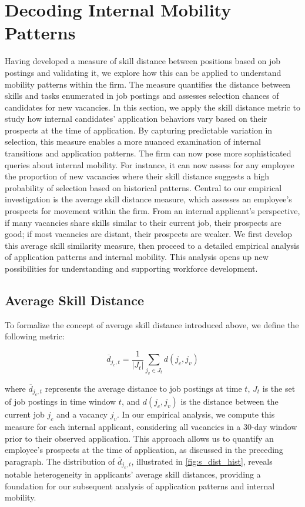 
\section{Decoding Internal Mobility Patterns}\label{sec:internal_mobility_patterns}


Having developed a measure of skill distance between positions based on job postings and validating it, we explore how 
this can be applied to understand mobility patterns within the firm. The measure quantifies the distance between skills 
and tasks enumerated in job postings and assesses selection chances of candidates for new vacancies. In this section, 
we apply the skill distance metric to study how internal candidates' application behaviors vary based on their 
prospects at the time of application. By capturing predictable variation in selection, this measure enables a more 
nuanced examination of internal transitions and application patterns. The firm can now pose more sophisticated queries 
about internal mobility. For instance, it can now assess for any employee the proportion of new vacancies where their 
skill distance suggests a high probability of selection based on historical patterns. Central to our empirical 
investigation is the average skill distance measure, which assesses an employee's prospects for movement within the firm. 
From an internal applicant's perspective, if many vacancies share skills similar to their current job, their prospects are 
good; if most vacancies are distant, their prospects are weaker. We first develop this average skill similarity measure, 
then proceed to a detailed empirical analysis of application patterns and internal mobility. This analysis opens up new 
possibilities for understanding and supporting workforce development.




\subsection{Average Skill Distance}

To formalize the concept of average skill distance introduced above, we define the following metric:

\begin{equation}
    \overline{d}_{j_c, t} = \frac{1}{|J_t|} \sum_{j_v \in J_t} d(j_c, j_v)
\end{equation}

where $\overline{d}_{j_c, t}$ represents the average distance to job postings at time $t$, $J_t$ is the set of job postings in time window $t$, and $d(j_c, j_v)$ is the distance between the current job $j_c$ and a vacancy $j_v$. In our empirical analysis, we compute this measure for each internal applicant, considering all vacancies in a 30-day window prior to their observed application. This approach allows us to quantify an employee's prospects at the time of application, as discussed in the preceding paragraph. The distribution of $\overline{d}_{j_c, t}$, illustrated in \autoref{fig:s_dist_hist}, reveals notable heterogeneity in applicants' average skill distances, providing a foundation for our subsequent analysis of application patterns and internal mobility.

